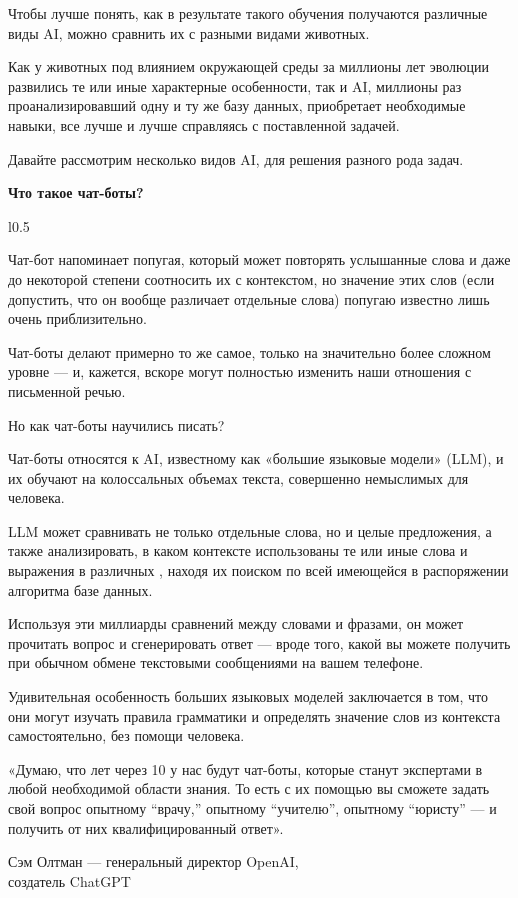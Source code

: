 Чтобы лучше понять, как в результате такого обучения получаются различные виды AI, можно сравнить их с разными видами животных.

Как у животных под влиянием окружающей среды за миллионы лет эволюции развились те или иные характерные особенности, так и AI, миллионы раз проанализировавший одну и ту же базу данных, приобретает необходимые навыки, все лучше и лучше справляясь с поставленной задачей.

Давайте рассмотрим несколько видов AI,  для решения разного рода задач.

\textbf{Что такое чат-боты?}

\begin{wrapfigure}{l}{0.5\textwidth}
    \begin{fancyquotes}
        Чат-бот напоминает попугая, который может повторять услышанные слова и даже до некоторой степени соотносить их с контекстом, но значение этих слов (если допустить, что он вообще различает отдельные слова) попугаю известно лишь очень приблизительно.
    \end{fancyquotes}
\end{wrapfigure}

Чат-боты делают примерно то же самое, только на значительно более сложном уровне — и, кажется, вскоре могут полностью изменить наши отношения с письменной речью.

Но как чат-боты научились писать?

Чат-боты относятся к  AI, известному как «большие языковые модели» (LLM), и их обучают на колоссальных объемах текста, совершенно немыслимых для человека.

LLM может сравнивать не только отдельные слова, но и целые предложения, а также анализировать, в каком контексте использованы те или иные слова и выражения в различных , находя их поиском по всей имеющейся в распоряжении алгоритма базе данных.

Используя эти миллиарды сравнений между словами и фразами, он может прочитать вопрос и сгенерировать ответ — вроде того, какой вы можете получить при обычном обмене текстовыми сообщениями на вашем телефоне.

Удивительная особенность больших языковых моделей заключается в том, что они могут изучать правила грамматики и определять значение слов из контекста самостоятельно, без помощи человека.

\begin{fancyquotes}
    «Думаю, что лет через 10 у нас будут чат-боты, которые станут экспертами в любой необходимой области знания. То есть с их помощью вы сможете задать свой вопрос опытному ``врачу,'' опытному ``учителю'', опытному ``юристу'' --- и получить от них квалифицированный ответ».\\

    \begin{flushright}
        Сэм Олтман — генеральный директор OpenAI,\\
        создатель ChatGPT
    \end{flushright}
\end{fancyquotes}

